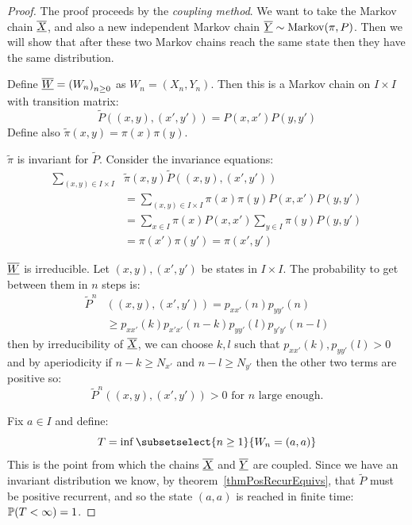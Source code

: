 \documentclass[../Main.tex]{subfiles}
\begin{document}
\begin{proof}
    The proof proceeds by the \textit{coupling method}. We want to take the Markov chain $\chain{X}$, and also a new independent Markov chain $\chain{Y} \sim \operatorname{Markov}(\pi, P)$. Then we will show that after these two Markov chains reach the same state then they have the same distribution.

    Define $\chain{W} = \left(W_n\right)_{n \geq 0}$ as $W_n = (X_n, Y_n)$. Then this is a Markov chain on $I \times I$ with transition matrix:
    \begin{equation*}
        \tilde{P}((x, y), (x', y')) = P(x, x')P(y, y')
    \end{equation*}
    Define also $\tilde{\pi}(x, y) = \pi(x) \pi(y)$.
    \begin{subproof}{$\tilde{\pi}$ is invariant for $\tilde{P}$.}
        Consider the invariance equations:
        \begin{align*}
            \sum_{(x, y) \in I \times I} &\tilde{\pi}(x, y) \tilde{P}((x, y), (x', y')) \\
            &= \sum_{(x, y) \in I \times I} \pi(x) \pi(y) P(x, x') P(y, y') \\
            &= \sum_{x \in I} \pi(x) P(x, x') \sum_{y \in I} \pi(y) P(y, y') \\
            &= \pi(x') \pi(y') = \pi(x', y')
        \end{align*}
    \end{subproof}
    \begin{subproof}{$\chain{W}$ is irreducible.}
        Let $(x, y), (x' ,y')$ be states in $I \times I$. The probability to get between them in $n$ steps is:
        \begin{align*}
            \tilde{P}^n&((x, y), (x', y')) = p_{xx'}(n) p_{yy'}(n) \\
            &\geq p_{xx'}(k) p_{x'x'}(n-k) p_{yy'}(l) p_{y'y'}(n-l)
        \end{align*}
        then by irreducibility of $\chain{X}$, we can choose $k, l$ such that $p_{xx'}(k), p_{yy'}(l) > 0$ and by aperiodicity if $n - k \geq N_{x'}$ and $n - l \geq N_{y'}$ then the other two terms are positive so:
        \begin{equation*}
            \tilde{P}^n((x, y), (x', y')) > 0 \text{ for $n$ large enough.}
        \end{equation*}
    \end{subproof}
    Fix $a \in I$ and define:
    \begin{equation*}
        T = \inf\subsetselect{n \geq 1}{W_n = (a, a)}
    \end{equation*}
    This is the point from which the chains $\chain{X}$ and $\chain{Y}$ are coupled. Since we have an invariant distribution we know, by theorem~\ref{thmPosRecurEquivs}, that $\tilde{P}$ must be positive recurrent, and so the state $(a, a)$ is reached in finite time: $\P(T < \infty) = 1$.


\end{proof}
\end{document}
